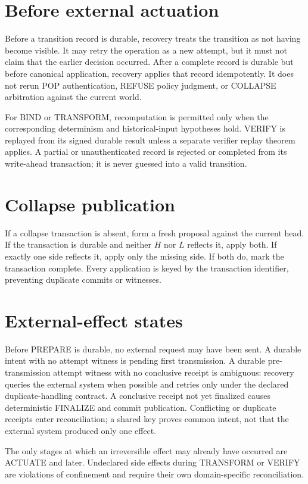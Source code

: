 \documentclass[11pt,openany]{book}
\begin{document}
\section{Before external actuation}
Before a transition record is durable, recovery treats the transition as not
having become visible. It may retry the operation as a new attempt, but it must
not claim that the earlier decision occurred. After a complete record is
durable but before canonical application, recovery applies that record
idempotently. It does not rerun POP authentication, REFUSE policy judgment, or
COLLAPSE arbitration against the current world.

For BIND or TRANSFORM, recomputation is permitted only when the corresponding
determinism and historical-input hypotheses hold. VERIFY is replayed from its
signed durable result unless a separate verifier replay theorem applies. A
partial or unauthenticated record is rejected or completed from its
write-ahead transaction; it is never guessed into a valid transition.

\section{Collapse publication}
If a collapse transaction is absent, form a fresh proposal against the current
head. If the transaction is durable and neither \(H\) nor \(L\) reflects it,
apply both. If exactly one side reflects it, apply only the missing side. If
both do, mark the transaction complete. Every application is keyed by the
transaction identifier, preventing duplicate commits or witnesses.

\section{External-effect states}
Before PREPARE is durable, no external request may have been sent. A durable
intent with no attempt witness is pending first transmission. A durable
pre-transmission attempt witness with no conclusive receipt is ambiguous:
recovery queries the external system when possible and retries only under the
declared duplicate-handling contract. A conclusive receipt not yet finalized
causes deterministic FINALIZE and commit publication. Conflicting or duplicate
receipts enter reconciliation; a shared key proves common intent, not that the
external system produced only one effect.

The only stages at which an irreversible effect may already have occurred are
ACTUATE and later. Undeclared side effects during TRANSFORM or VERIFY are
violations of confinement and require their own domain-specific reconciliation.
\end{document}
